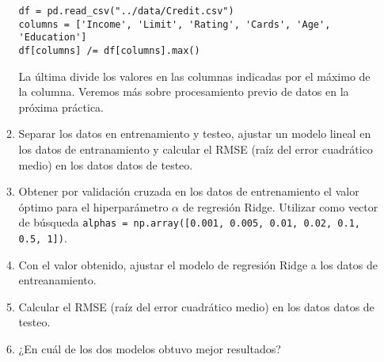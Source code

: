 \documentclass[a4paper,11pt]{article}
\theoremstyle{definition}
\begin{document}
\begin{enumerate}
\begin{enumerate}
\begin{lstlisting}
df = pd.read_csv("../data/Credit.csv")
columns = ['Income', 'Limit', 'Rating', 'Cards', 'Age', 'Education']
df[columns] /= df[columns].max()
\end{lstlisting}

La última divide los valores en las columnas indicadas por el máximo de la columna. Veremos más sobre procesamiento previo de datos en la próxima práctica.

\item Separar los datos en entrenamiento y testeo, ajustar un modelo lineal en los datos de entranamiento y calcular el RMSE (raíz del error cuadrático medio) en los datos datos de testeo.
\item Obtener por validación cruzada en los datos de entrenamiento el valor óptimo para el hiperparámetro $\alpha$ de regresión Ridge. Utilizar como vector de búsqueda \lstinline{alphas = np.array([0.001, 0.005, 0.01, 0.02, 0.1, 0.5, 1])}.
\item Con el valor obtenido, ajustar el modelo de regresión Ridge a los datos de entreanamiento.
\item Calcular el RMSE (raíz del error cuadrático medio) en los datos datos de testeo. 
\item ¿En cuál de los dos modelos obtuvo mejor resultados?
\end{enumerate}

\end{enumerate}
\end{document}
